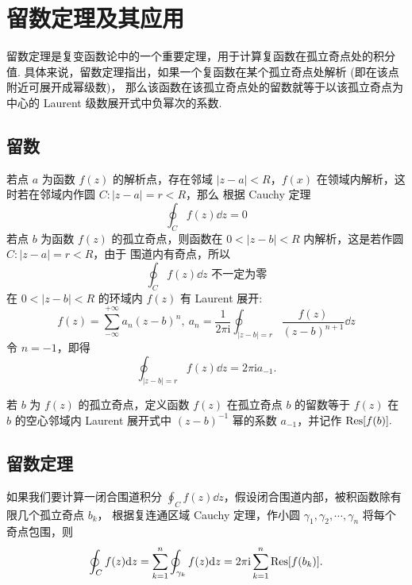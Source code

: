 \section{留数定理及其应用}

留数定理是复变函数论中的一个重要定理，用于计算复函数在孤立奇点处的积分值. 
具体来说，留数定理指出，如果一个复函数在某个孤立奇点处解析 (即在该点附近可展开成幂级数)，
那么该函数在该孤立奇点处的留数就等于以该孤立奇点为中心的 Laurent 级数展开式中负幂次的系数. 

\subsection{留数}

若点 $a$ 为函数 $f(z)$ 的解析点，存在邻域 $|z-a|<R$，$f(x)$ 在领域内解析，这时若在邻域内作圆
$C:|z-a|=r<R$，那么 根据 Cauchy 定理
$$\oint_{C}f(z)\dd z=0$$
若点 $b$ 为函数 $f(z)$ 的孤立奇点，则函数在 $0<|z-b|<R$ 内解析，这是若作圆 $C:|z-a|=r<R$，由于
围道内有奇点，所以 $$\oint_C f(z)\dd z\text{ 不一定为零}$$
在 $0<|z-b|<R$ 的环域内 $f(z)$ 有 Laurent 展开:
$$f(z)=\sum_{-\infty}^{+\infty}a_n(z-b)^n,~a_n=\dfrac{1}{2\pi\mathrm{i}}\oint_{|z-b|=r}\dfrac{f(z)}{(z-b)^{n+1}}\dd z$$
令 $n=-1$，即得 $$\oint_{|z-b|=r}f(z)\dd z=2\pi\mathrm{i}a_{-1}.$$

\begin{definition}[留数]
    若 $b$ 为 $f(z)$ 的孤立奇点，定义函数 $f(z)$ 在孤立奇点 $b$ 的留数等于 $f(z)$ 在 $b$ 的空心邻域内 Laurent
    展开式中 $(z-b)^{-1}$ 幂的系数 $a_{-1}$，并记作 $\Res[f(b)].$
\end{definition}

\subsection{留数定理}

如果我们要计算一闭合围道积分 $\displaystyle\oint_{C}f(z)\dd z$，假设闭合围道内部，被积函数除有限几个孤立奇点 $b_k$，
根据复连通区域 Cauchy 定理，作小圆 $\gamma_1,\gamma_2,\cdots,\gamma_{n}$ 将每个奇点包围，则
$$\oint_{C}f(z)\dd z=\sum_{k=1}^{n}\oint_{\gamma_k}f(z)\dd z=2\pi\i\sum_{k=1}^{n}\Res[f(b_k)].$$

